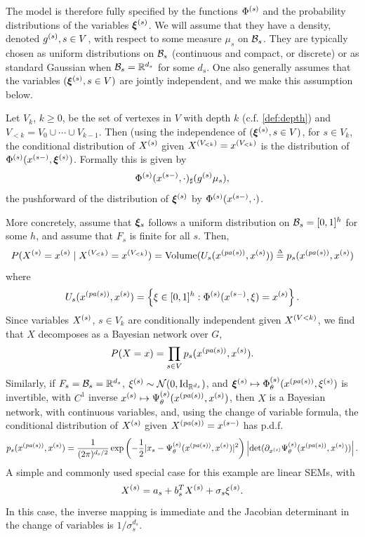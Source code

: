 The model is therefore fully specified by the functions $\Phi^{(s)}$ and the probability distributions of the variables ${\bm{\xi}}^{(s)}$. We will assume that they have a density, denoted $g^{(s)}, s\in V$, with respect to some measure $\mu_s$ on ${\mathcal B}_s$. 
They are typically chosen as uniform distributions on ${\mathcal B}_s$ (continuous and compact, or discrete) or as standard Gaussian when ${\mathcal B}_s = {\mathbb{R}}^{d_s}$ for some $d_s$. One also generally assumes that the variables $({\bm{\xi}}^{(s)}, s\in V)$ are jointly independent, and we make this assumption below.


Let $V_k$, $k\geq 0$, be the set of vertexes in $V$ with depth $k$ (c.f. \cref{def:depth}) and $V_{<k} = V_0 \cup \cdots\cup V_{k-1}$. Then (using the independence of $({\bm{\xi}}^{(s)}, s\in V)$, for $s\in V_k$,  the conditional distribution of $X^{(s)}$ given $X^{(V_{<k})} = x^{(V_{<k})}$ is the distribution  of $\Phi^{(s)}(x^{(s-)}, {\bm{\xi}}^{(s)})$. Formally this is given by 
\[
\Phi^{(s)}(x^{(s-)}, \cdot)_{\sharp} (g^{(s)}\mu_s),
\]
the pushforward of the distribution of ${\bm{\xi}}^{(s)}$ by $\Phi^{(s)}(x^{(s-)}, \cdot)$.

More concretely, assume that ${\bm{\xi}}_s$ follows a uniform distribution on ${\mathcal B}_s = [0, 1]^h$ for some $h$, and assume that $F_s$ is finite for all $s$. Then,
\[
P(X^{(s)} = x^{(s)} \mid X^{(V_{<k})} = x^{(V_{<k})}) = \mathrm{Volume}(U_s(  x^{({\mathit{pa}(s)})}, x^{(s)})) \stackrel{{\scriptscriptstyle \Delta}}{=} p_s( x^{({\mathit{pa}(s)})}, x^{(s)})
\]
where 
\[
U_s(x^{({\mathit{pa}(s)})}, x^{(s)}) = \left\{\xi\in [0,1]^h :  \Phi^{(s)}(x^{(s-)}, \xi) = x^{(s)}\right\}.
\] 
Since variables $X^{(s)}$, $s\in V_k$ are conditionally independent given $X^{(V<k)}$, we find that $X$ decomposes as a Bayesian network over $G$, 
\[
P(X=x) = \prod_{s\in V}  p_s( x^{({\mathit{pa}(s)})}, x^{(s)}).
\]
Similarly, if $F_s = {\mathcal B}_s = {\mathbb{R}}^{d_s}$, $\pe \xi s\sim\CN(0, \Id[d_s])$, and ${\bm{\xi}}^{(s)} \mapsto \Phi_\theta^{(s)}(x^{({\mathit{pa}(s)})}, \xi^{(s)})$ is invertible, with $C^1$ inverse $x^{(s)} \mapsto \Psi_\theta^{(s)}(x^{({\mathit{pa}(s)})}, x^{(s)})$, then $X$ is a Bayesian network, with continuous variables, and, using the change of variable formula, the conditional distribution of $X^{(s)}$ given $X^{({\mathit{pa}(s)})} = x^{(s-)}$ has  p.d.f.
\[
 p_s( x^{({\mathit{pa}(s)})}, x^{(s)}) = \frac{1}{(2\pi)^{d_s/2}} \exp\left(-\frac12 |x_s - 
\Psi_\theta^{(s)}(x^{({\mathit{pa}(s)})}, x^{(s)})|^2\right) \left|\det (\partial_{x^{(s)}}\Psi_\theta^{(s)}(x^{({\mathit{pa}(s)})}, x^{(s)}))\right|.
\]
A simple and commonly used special case for this example are linear SEMs, with
\[
X^{(s)} = a_s + b_s^TX^{(s)} + \sigma_s \xi^{(s)}.
\] 
In this case, the inverse mapping is immediate and the Jacobian determinant in the change of variables is $1/\sigma_s^{d_s}$. 



